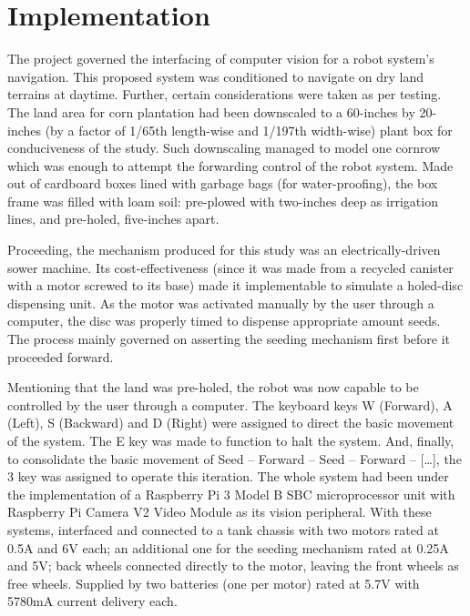 \section{Implementation}

	The project governed the interfacing of computer vision for a robot system’s navigation. This proposed system was conditioned to navigate on dry land terrains at daytime. Further, certain considerations were taken as per testing. The land area for corn plantation had been downscaled to a 60-inches by 20-inches (by a factor of 1/65th length-wise and 1/197th width-wise) plant box for conduciveness of the study. Such downscaling managed to model one cornrow which was enough to attempt the forwarding control of the robot system. Made out of cardboard boxes lined with garbage bags (for water-proofing), the box frame was filled with loam soil: pre-plowed with two-inches deep as irrigation lines, and pre-holed, five-inches apart.
	
	Proceeding, the mechanism produced for this study was an electrically-driven sower machine. Its cost-effectiveness (since it was made from a recycled canister with a motor screwed to its base) made it implementable to simulate a holed-disc dispensing unit. As the motor was activated manually by the user through a computer, the disc was properly timed to dispense appropriate amount seeds. The process mainly governed on asserting the seeding mechanism first before it proceeded forward.
	
	Mentioning that the land was pre-holed, the robot was now capable to be controlled by the user through a computer. The keyboard keys W (Forward), A (Left), S (Backward) and D (Right) were assigned to direct the basic movement of the system. The E key was made to function to halt the system. And, finally, to consolidate the basic movement of Seed – Forward – Seed – Forward – […], the 3 key was assigned to operate this iteration. The whole system had been under the implementation of a Raspberry Pi 3 Model B SBC microprocessor unit with Raspberry Pi Camera V2 Video Module as its vision peripheral. With these systems, interfaced and connected to a tank chassis with two motors rated at 0.5A and 6V each; an additional one for the seeding mechanism rated at 0.25A and 5V; back wheels connected directly to the motor, leaving the front wheels as free wheels. Supplied by two batteries (one per motor) rated at 5.7V with 5780mA current delivery each.

	
